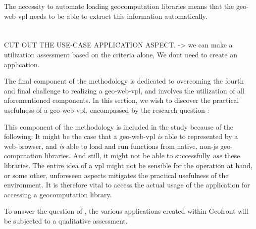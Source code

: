 The necessity to automate loading geocomputation libraries means that the \ac{geo-web-vpl} needs to be able to extract this information automatically. 


\section{\mySubRQFourTitle} 
\label{sec:method-four}

\begin{note}
  CUT OUT THE USE-CASE APPLICATION ASPECT. 
  -> we can make a utilization assessment based on the criteria alone, We dont need to create an application.
\end{note}

The final component of the methodology is dedicated to overcoming the fourth and final challenge to realizing a \ac{geo-web-vpl}, and involves the utilization of all aforementioned components. 
In this section, we wish to discover the practical usefulness of a \ac{geo-web-vpl}, encompassed by the research question : \mySubRQFour


This component of the methodology is included in the study because of the following: 
It might be the case that a geo-web-vpl \emph{is} able to represented by a web-browser, and \emph{is} able to load and run functions from native, non-js geo-computation libraries. 
And still, it might not be able to successfully \emph{use} these libraries. 
The entire idea of a vpl might not be sensible for the operation at hand, or some other, unforeseen aspects mitigates the practical usefulness of the environment. 
It is therefore vital to access the actual usage of the application for accessing a geocomputation library.

To answer the question of \mySubRQFourTitle, the various applications created within Geofront will be subjected to a qualitative assessment. 

